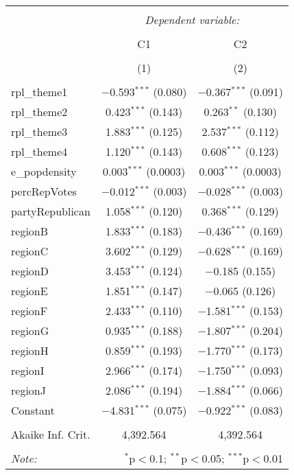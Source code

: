 
\begin{table}[!htbp] \centering 
  \caption{} 
  \label{} 
\begin{tabular}{@{\extracolsep{5pt}}lcc} 
\\[-1.8ex]\hline 
\hline \\[-1.8ex] 
 & \multicolumn{2}{c}{\textit{Dependent variable:}} \\ 
\cline{2-3} 
\\[-1.8ex] & C1 & C2 \\ 
\\[-1.8ex] & (1) & (2)\\ 
\hline \\[-1.8ex] 
 rpl\_theme1 & $-$0.593$^{***}$ (0.080) & $-$0.367$^{***}$ (0.091) \\ 
  rpl\_theme2 & 0.423$^{***}$ (0.143) & 0.263$^{**}$ (0.130) \\ 
  rpl\_theme3 & 1.883$^{***}$ (0.125) & 2.537$^{***}$ (0.112) \\ 
  rpl\_theme4 & 1.120$^{***}$ (0.143) & 0.608$^{***}$ (0.123) \\ 
  e\_popdensity & 0.003$^{***}$ (0.0003) & 0.003$^{***}$ (0.0003) \\ 
  percRepVotes & $-$0.012$^{***}$ (0.003) & $-$0.028$^{***}$ (0.003) \\ 
  partyRepublican & 1.058$^{***}$ (0.120) & 0.368$^{***}$ (0.129) \\ 
  regionB & 1.833$^{***}$ (0.183) & $-$0.436$^{***}$ (0.169) \\ 
  regionC & 3.602$^{***}$ (0.129) & $-$0.628$^{***}$ (0.169) \\ 
  regionD & 3.453$^{***}$ (0.124) & $-$0.185 (0.155) \\ 
  regionE & 1.851$^{***}$ (0.147) & $-$0.065 (0.126) \\ 
  regionF & 2.433$^{***}$ (0.110) & $-$1.581$^{***}$ (0.153) \\ 
  regionG & 0.935$^{***}$ (0.188) & $-$1.807$^{***}$ (0.204) \\ 
  regionH & 0.859$^{***}$ (0.193) & $-$1.770$^{***}$ (0.173) \\ 
  regionI & 2.966$^{***}$ (0.174) & $-$1.750$^{***}$ (0.093) \\ 
  regionJ & 2.086$^{***}$ (0.194) & $-$1.884$^{***}$ (0.066) \\ 
  Constant & $-$4.831$^{***}$ (0.075) & $-$0.922$^{***}$ (0.083) \\ 
 \hline \\[-1.8ex] 
Akaike Inf. Crit. & 4,392.564 & 4,392.564 \\ 
\hline 
\hline \\[-1.8ex] 
\textit{Note:}  & \multicolumn{2}{r}{$^{*}$p$<$0.1; $^{**}$p$<$0.05; $^{***}$p$<$0.01} \\ 
\end{tabular} 
\end{table} 
